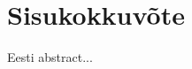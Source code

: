 
\chapter{Sisukokkuv\~{o}te} %


Eesti abstract...





\ifpdf
    \graphicspath{{7/figures/PNG/}{7/figures/PDF/}{7/figures/}}
\else
    \graphicspath{{7/figures/EPS/}{7/figures/}}
\fi








